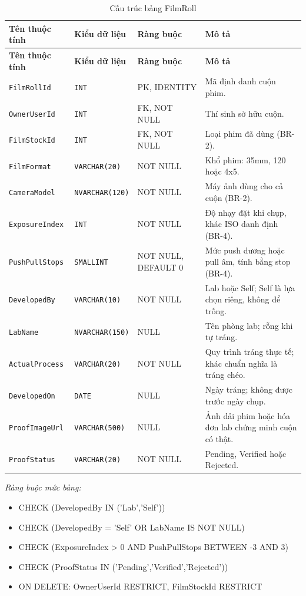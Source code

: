 \begin{longtable}{|L{4cm}|L{3.15cm}|L{2.4cm}|L{4.55cm}|}
\caption{Cấu trúc bảng FilmRoll} \\
\hline
\textbf{Tên thuộc tính} & \textbf{Kiểu dữ liệu} & \textbf{Ràng buộc} & \textbf{Mô tả} \\ \hline
\endfirsthead
\hline
\textbf{Tên thuộc tính} & \textbf{Kiểu dữ liệu} & \textbf{Ràng buộc} & \textbf{Mô tả} \\ \hline
\endhead
\texttt{FilmRollId} & \texttt{INT} & PK, IDENTITY & Mã định danh cuộn phim. \\ \hline
\texttt{OwnerUserId} & \texttt{INT} & FK, NOT NULL & Thí sinh sở hữu cuộn. \\ \hline
\texttt{FilmStockId} & \texttt{INT} & FK, NOT NULL & Loại phim đã dùng (BR-2). \\ \hline
\texttt{FilmFormat} & \texttt{VARCHAR(20)} & NOT NULL & Khổ phim: 35mm, 120 hoặc 4x5. \\ \hline
\texttt{CameraModel} & \texttt{NVARCHAR(120)} & NOT NULL & Máy ảnh dùng cho cả cuộn (BR-2). \\ \hline
\texttt{ExposureIndex} & \texttt{INT} & NOT NULL & Độ nhạy đặt khi chụp, khác ISO danh định (BR-4). \\ \hline
\texttt{PushPullStops} & \texttt{SMALLINT} & NOT NULL, DEFAULT 0 & Mức push dương hoặc pull âm, tính bằng stop (BR-4). \\ \hline
\texttt{DevelopedBy} & \texttt{VARCHAR(10)} & NOT NULL & Lab hoặc Self; Self là lựa chọn riêng, không để trống. \\ \hline
\texttt{LabName} & \texttt{NVARCHAR(150)} & NULL & Tên phòng lab; rỗng khi tự tráng. \\ \hline
\texttt{ActualProcess} & \texttt{VARCHAR(20)} & NOT NULL & Quy trình tráng thực tế; khác chuẩn nghĩa là tráng chéo. \\ \hline
\texttt{DevelopedOn} & \texttt{DATE} & NULL & Ngày tráng; không được trước ngày chụp. \\ \hline
\texttt{ProofImageUrl} & \texttt{VARCHAR(500)} & NULL & Ảnh dải phim hoặc hóa đơn lab chứng minh cuộn có thật. \\ \hline
\texttt{ProofStatus} & \texttt{VARCHAR(20)} & NOT NULL & Pending, Verified hoặc Rejected. \\ \hline
\end{longtable}

\noindent\textit{Ràng buộc mức bảng:}

\begin{itemize}\raggedright
    \item CHECK (DevelopedBy IN ('Lab',\allowbreak{}'Self'))
    \item CHECK (DevelopedBy = 'Self' OR LabName IS NOT NULL)
    \item CHECK (ExposureIndex > 0 AND PushPullStops BETWEEN -3 AND 3)
    \item CHECK (ProofStatus IN ('Pending',\allowbreak{}'Verified',\allowbreak{}'Rejected'))
    \item ON DELETE: OwnerUserId RESTRICT,\allowbreak{} FilmStockId RESTRICT
\end{itemize}

